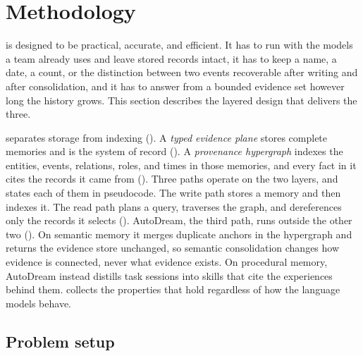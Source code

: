 \providecommand{\method}{\ours}

\section{Methodology}
\label{sec:method}

\method is designed to be practical, accurate, and efficient. It has to run
with the models a team already uses and leave stored records intact, it has to
keep a name, a date, a count, or the distinction between two events recoverable
after writing and after consolidation, and it has to answer from a bounded
evidence set however long the history grows. This section describes the
layered design that delivers the three.

\method separates storage from indexing (). A \emph{typed evidence plane} stores complete
memories and is the system of record (). A
\emph{provenance hypergraph} indexes the entities, events, relations, roles, and
times in those memories, and every fact in it cites the records it came from
(). Three paths operate on the two layers, and
 states each of them in pseudocode. The write path stores a
memory and then indexes it. The read path plans a query, traverses the
graph, and dereferences only the records it selects ().
AutoDream, the third path, runs outside the other two (). On semantic memory it
merges duplicate anchors in the hypergraph and returns the evidence store
unchanged, so semantic consolidation changes how evidence is connected, never
what evidence exists. On procedural
memory, AutoDream instead distills task sessions into skills that cite the
experiences behind them.  collects the properties that hold regardless of
how the language models behave.

\subsection{Problem setup}
\label{sec:method-setup}

